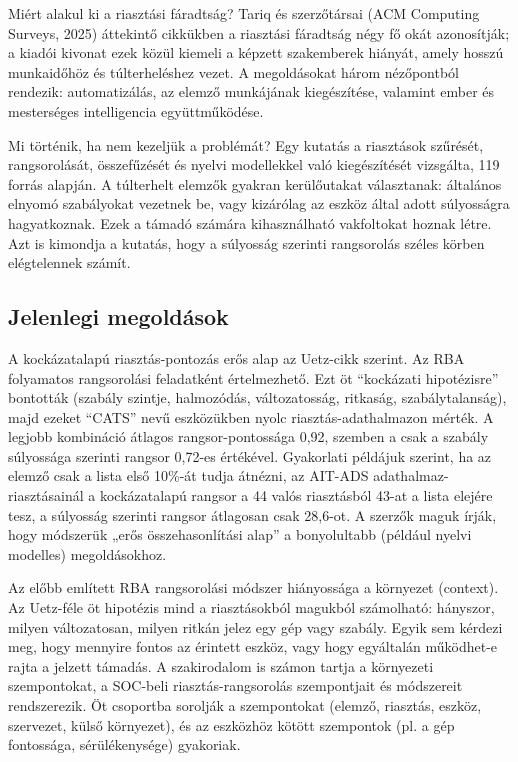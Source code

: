 Miért alakul ki a riasztási fáradtság? Tariq és szerzőtársai (ACM Computing Surveys, 2025) áttekintő cikkükben a riasztási fáradtság négy fő okát azonosítják; a kiadói kivonat ezek közül kiemeli a képzett szakemberek hiányát, amely hosszú munkaidőhöz és túlterheléshez vezet. A megoldásokat három nézőpontból rendezik: automatizálás, az elemző munkájának kiegészítése, valamint ember és mesterséges intelligencia együttműködése. \cite{tariq2025}

Mi történik, ha nem kezeljük a problémát? Egy kutatás a riasztások szűrését, rangsorolását, összefűzését és nyelvi modellekkel való kiegészítését vizsgálta, 119 forrás alapján. A túlterhelt elemzők gyakran kerülőutakat választanak: általános elnyomó szabályokat vezetnek be, vagy kizárólag az eszköz által adott súlyosságra hagyatkoznak. Ezek a támadó számára kihasználható vakfoltokat hoznak létre. Azt is kimondja a kutatás, hogy a súlyosság szerinti rangsorolás széles körben elégtelennek számít.

\subsection{Jelenlegi megoldások}\label{sec:megoldasok}
A kockázatalapú riasztás-pontozás erős alap az Uetz-cikk szerint. Az \ac{RBA} folyamatos rangsorolási feladatként értelmezhető. Ezt öt \enquote{kockázati hipotézisre} bontották (szabály szintje, halmozódás, változatosság, ritkaság, szabálytalanság), majd ezeket \enquote{CATS} nevű eszközükben nyolc riasztás-adathalmazon mérték. A legjobb kombináció átlagos rangsor-pontossága 0,92, szemben a csak a szabály súlyossága szerinti rangsor 0,72-es értékével. Gyakorlati példájuk szerint, ha az elemző csak a lista első 10\%-át tudja átnézni, az AIT-ADS adathalmaz-riasztásainál a kockázatalapú rangsor a 44 valós riasztásból 43-at a lista elejére tesz, a súlyosság szerinti rangsor átlagosan csak 28,6-ot. A szerzők maguk írják, hogy módszerük „erős összehasonlítási alap” a bonyolultabb (például nyelvi modelles) megoldásokhoz. \cite{uetz2026rba}

Az előbb említett \ac{RBA} rangsorolási módszer hiányossága a környezet (context). Az Uetz-féle öt hipotézis mind a riasztásokból magukból számolható: hányszor, milyen változatosan, milyen ritkán jelez egy gép vagy szabály. Egyik sem kérdezi meg, hogy mennyire fontos az érintett eszköz, vagy hogy egyáltalán működhet-e rajta a jelzett támadás. A szakirodalom is számon tartja a környezeti szempontokat, a SOC-beli riasztás-rangsorolás szempontjait és módszereit rendszerezik. Öt csoportba sorolják a szempontokat (elemző, riasztás, eszköz, szervezet, külső környezet), és az eszközhöz kötött szempontok (pl. a gép fontossága, sérülékenysége) gyakoriak. \cite{jalalvand2024}

